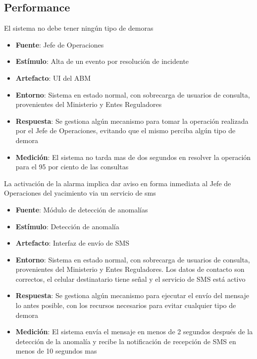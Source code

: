 \subsection{Performance}

El sistema no debe tener ningún tipo de demoras
\begin{itemize}
\item {\bf Fuente}: Jefe de Operaciones
\item {\bf Estímulo}: Alta de un evento por resolución de incidente
\item {\bf Artefacto}: UI del ABM
\item {\bf Entorno}: Sistema en estado normal, con sobrecarga de usuarios de consulta, provenientes del Ministerio y Entes Reguladores
\item {\bf Respuesta}: Se gestiona algún mecanismo para tomar la operación realizada por el Jefe de Operaciones, evitando que el mismo perciba algún tipo de demora
\item {\bf Medición}: El sistema no tarda mas de dos segundos en resolver la operación para el 95 por ciento de las consultas
\end{itemize}

La activación de la alarma implica dar aviso en forma inmediata al Jefe de Operaciones del yacimiento via un servicio de sms
\begin{itemize}
\item {\bf Fuente}: Módulo de detección de anomalías
\item {\bf Estímulo}: Detección de anomalía
\item {\bf Artefacto}: Interfaz de envío de SMS
\item {\bf Entorno}: Sistema en estado normal, con sobrecarga de usuarios de consulta, provenientes del Ministerio y Entes Reguladores. Los datos de contacto son correctos, el celular destinatario tiene señal y el servicio de SMS está activo
\item {\bf Respuesta}: Se gestiona algún mecanismo para ejecutar el envío del mensaje lo antes posible, con los recursos necesarios para evitar cualquier tipo de demora
\item {\bf Medición}: El sistema envía el mensaje en menos de 2 segundos después de la detección de la anomalía y recibe la notificación de recepción de SMS en menos de 10 segundos mas 
\end{itemize}

